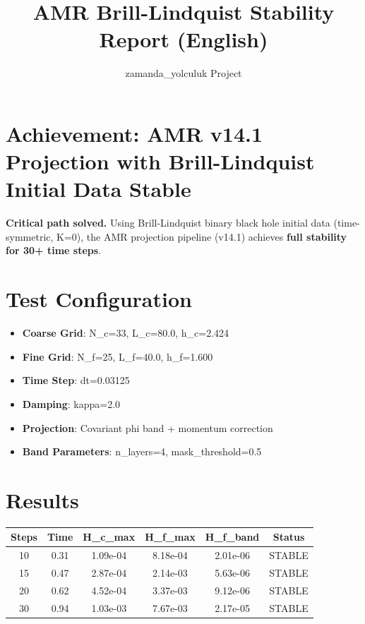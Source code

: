 \documentclass[11pt,a4paper]{article}
\title{AMR Brill-Lindquist Stability Report (English)}
\author{zamanda\_yolculuk Project}
\date{}
\begin{document}
\maketitle

\section*{Achievement: AMR v14.1 Projection with Brill-Lindquist Initial Data Stable}

\textbf{Critical path solved.} Using Brill-Lindquist binary black hole initial data (time-symmetric, K=0), the AMR projection pipeline (v14.1) achieves \textbf{full stability for 30+ time steps}.

\section*{Test Configuration}
\begin{itemize}
    \item \textbf{Coarse Grid}: N\_c=33, L\_c=80.0, h\_c=2.424
    \item \textbf{Fine Grid}: N\_f=25, L\_f=40.0, h\_f=1.600
    \item \textbf{Time Step}: dt=0.03125
    \item \textbf{Damping}: kappa=2.0
    \item \textbf{Projection}: Covariant phi band + momentum correction
    \item \textbf{Band Parameters}: n\_layers=4, mask\_threshold=0.5
\end{itemize}

\section*{Results}

\begin{longtable}{cccccc}
\toprule
Steps & Time & H\_c\_max & H\_f\_max & H\_f\_band & Status \\
\midrule
10 & 0.31 & 1.09e-04 & 8.18e-04 & 2.01e-06 & STABLE \\
15 & 0.47 & 2.87e-04 & 2.14e-03 & 5.63e-06 & STABLE \\
20 & 0.62 & 4.52e-04 & 3.37e-03 & 9.12e-06 & STABLE \\
30 & 0.94 & 1.03e-03 & 7.67e-03 & 2.17e-05 & STABLE \\
\bottomrule
\end{longtable}
\end{document}
